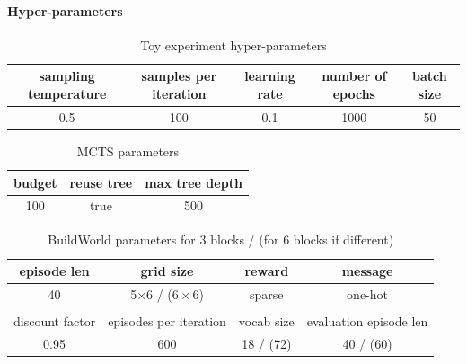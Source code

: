 \paragraph{Hyper-parameters}\textbf{ }
\begin{table}[h!]
    \centering
    \begin{tabular}{ccccc}
         sampling temperature & samples per iteration & learning rate & number of epochs & batch size\\
         \hline 
         0.5 & 100 & 0.1 & 1000 & 50
    \end{tabular}
    \caption{Toy experiment hyper-parameters}
\end{table}


\begin{table}[h!]
    \centering
    \begin{tabular}{ccc}
         budget & reuse tree & max tree depth \\
         \hline
         100 & true & 500  
    \end{tabular}
    \caption{MCTS parameters}
\end{table}


\begin{table}[h!]
    \centering
    \begin{tabular}{cccc}
        episode len & grid size & reward & message \\
        \hline
         40 & 5$\times$6 / ($6\times6$) & sparse & one-hot \\
         \\
         discount factor & episodes per iteration & vocab size & evaluation episode len\\
         \hline
         0.95 & 600 & 18 / (72) & 40 / (60)
    \end{tabular}
    \caption{BuildWorld parameters for 3 blocks / (for 6 blocks if different)}
\end{table}

